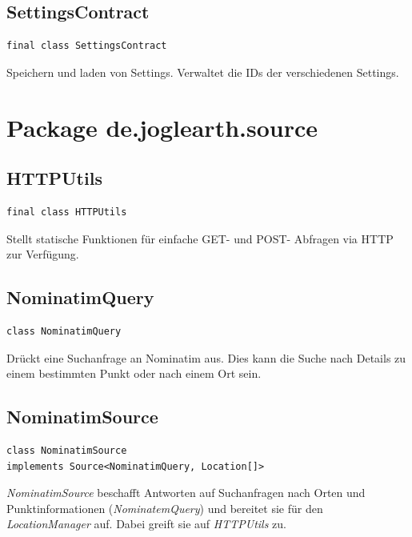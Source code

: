 \documentclass[10pt]{scrreprt}
\begin{document}
\vspace{5mm}
\subsection*{SettingsContract}
\begin{lstlisting}
final class SettingsContract
\end{lstlisting}
Speichern und laden von Settings. Verwaltet die IDs der verschiedenen Settings.\\



\vspace{5mm}
\section{Package de.joglearth.source}
\subsection*{HTTPUtils}
\begin{lstlisting}
final class HTTPUtils
\end{lstlisting}
Stellt statische Funktionen für einfache GET- und POST- Abfragen via HTTP zur Verfügung.\\

\vspace{5mm}
\subsection*{NominatimQuery}
\begin{lstlisting}
class NominatimQuery
\end{lstlisting}
Drückt eine Suchanfrage an Nominatim aus. Dies kann die Suche nach Details zu einem bestimmten Punkt oder nach einem Ort sein.\\

\vspace{5mm}
\subsection*{NominatimSource}
\begin{lstlisting}
class NominatimSource
implements Source<NominatimQuery, Location[]>
\end{lstlisting}
\textit{NominatimSource} beschafft Antworten auf Suchanfragen nach Orten und Punktinformationen (\textit{NominatemQuery}) und bereitet sie für den \textit{LocationManager} auf. Dabei greift sie auf \textit{HTTPUtils} zu.\\
\end{document}
